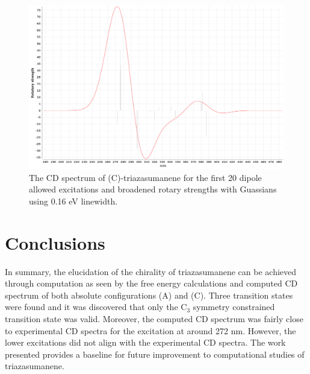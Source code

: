 \documentclass[11pt]{article}
\begin{document}
\begin{figure}[H]
  \center
  \includegraphics[scale=0.2]{opt2_cd.png}
  \caption{The CD spectrum of (C)-triazasumanene for the first 20 dipole allowed excitations
    and broadened rotary strengths with Guassians using 0.16 eV linewidth.}
  \label{fig:opt2cd}
\end{figure}

\section{Conclusions}

In summary, the elucidation of the chirality of triazasumanene can be achieved
through computation as seen by the free energy calculations and computed CD
spectrum of both absolute configurations (A) and (C). Three transition states
were found and it was discovered that only the C$_3$ symmetry constrained
transition state was valid. Moreover, the computed CD spectrum was fairly close
to experimental CD spectra\cite{doi:10.1246/bcsj.20170384} for the excitation at
around 272 nm. However, the lower excitations did not align with the experimental
CD spectra\cite{doi:10.1246/bcsj.20170384}. The work presented provides a baseline
for future improvement to computational studies of triazasumanene. 

\printbibliography
\end{document}
